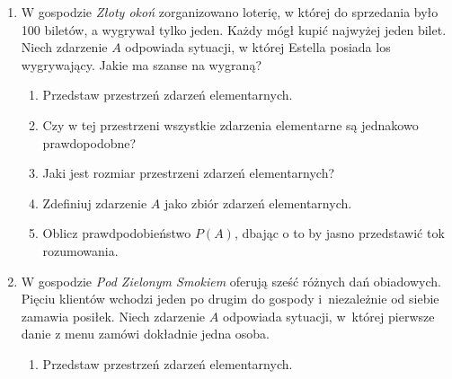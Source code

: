 \documentclass[twoside]{mwart}
\newcommand{\ans}[1]{}
\newenvironment{ansenv}{\comment}{\endcomment}
\newenvironment{ansenv}{\paragraph{Odpowiedź:}}{}
\newcommand{\ans}[1]{\begin{ansenv}#1\end{ansenv}}
\begin{document}
\begin{enumerate}
\begin{enumerate}
\ans{Alternatywne rozwiązanie korzysta z par uporządkowanych, wtedy wszystkie zbiory są dwa razy bardziej liczne, ale prawdopodobieństwa wychodzą takie same. Można też rozważyć przypadek losowania ze zwracaniem, wtedy $\Omega$ musi składać się z par \emph{uporządkowanych}, $\left|\Omega\right|=100$ no i liczności $A$ oraz $B$, a w konsekwencji prawdopodobieństwa wychodzą trochę inne.}
\end{enumerate}
\item W gospodzie \emph{Złoty okoń} zorganizowano loterię, w której do sprzedania było 100 biletów, a wygrywał tylko jeden. Każdy mógł kupić najwyżej jeden bilet. Niech zdarzenie $A$ odpowiada sytuacji, w której Estella posiada los wygrywający. Jakie ma szanse na wygraną?
\begin{enumerate}%
\item Przedstaw przestrzeń zdarzeń elementarnych. \ans{$\Omega=\{\omega_n|n=1,2,\ldots,100\}$}%
\item Czy w tej przestrzeni wszystkie zdarzenia elementarne są jednakowo prawdopodobne? \ans{Tak (przy czym jest to raczej kwestia założenia)}%
\item Jaki jest rozmiar przestrzeni zdarzeń elementarnych? \ans{$\left|\Omega\right|=100$}%
\item Zdefiniuj zdarzenie $A$ jako zbiór zdarzeń elementarnych. \ans{$A=\{\omega_1$\} (Wybieramy dowolny los jako wygrywający, powiedzmy ten, któremu odpowiada zdarzenie elementarne $\omega_1$)}%
\item Oblicz prawdpodobieństwo $P(A)$, dbając o to by jasno przedstawić tok rozumowania. \ans{
	Na podstawie odpowiedzi w punkcie b możemy posłużyć się prawdopodobieństwem klasycznym:
	$P(A)=\frac{\left|A\right|}{\left|\Omega\right|}=\frac{1}{100}$
}%
\end{enumerate}%
\item W gospodzie \emph{Pod Zielonym Smokiem} oferują sześć różnych dań obiadowych. Pięciu klientów wchodzi jeden po drugim do gospody
i~niezależnie od siebie zamawia posiłek. Niech zdarzenie $A$ odpowiada sytuacji, w~której pierwsze danie z menu zamówi dokładnie jedna osoba.%
\begin{enumerate}%
\item Przedstaw przestrzeń zdarzeń elementarnych. \ans{$\Omega=\{(i_1,\ldots,i_5)|i_j=1,2,\ldots,6\}$
	 Uporządkowane ciągi 5-ciu elementów, w których kolejne pozycje odpowiadają numerom dań zamówionych przez kolejnych klientów.
	 Musimy rozpatrywać wszystkich klientów jednocześnie, ponieważ nasze doświadczenie polega na obserwacji wszystkich klientów na raz (\emph{dokładnie jedna osoba}), a jednemu wynikowi obserwacji musi odpowiadac \emph{dokładnie jedno} zdarzenie elementarne.
}
\end{enumerate}
\end{enumerate}
\end{document}
